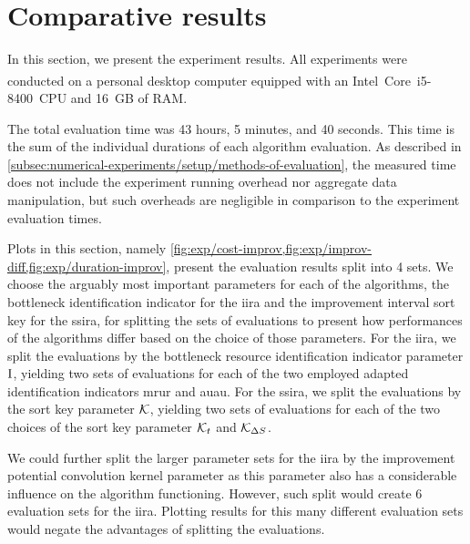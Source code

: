 \section{Comparative results} \label{sec:numerical-experiments/comparative-results}

In this section, we present the experiment results.
All experiments were conducted on a personal desktop computer equipped with an 
Intel\textsuperscript{\textregistered}~Core\texttrademark\ i5-8400~CPU and 16~GB of RAM.

The total evaluation time was 43 hours, 5 minutes, and 40 seconds.
This time is the sum of the individual durations of each algorithm evaluation.
As described in \cref{subsec:numerical-experiments/setup/methods-of-evaluation},
the measured time does not include the experiment running overhead nor aggregate data manipulation,
but such overheads are negligible in comparison to the experiment evaluation times.

Plots in this section, namely \cref{fig:exp/cost-improv,fig:exp/improv-diff,fig:exp/duration-improv},
present the evaluation results split into 4 sets.
We choose the arguably most important parameters for each of the algorithms,
the bottleneck identification indicator for the \ac{iira}
and the improvement interval sort key for the \ac{ssira},
for splitting the sets of evaluations to present how performances of the algorithms differ
based on the choice of those parameters.
For the \ac{iira},
we split the evaluations by the bottleneck resource identification indicator parameter $\mathrm{I}$,
yielding two sets of evaluations
for each of the two employed adapted identification indicators \ac{mrur} and \ac{auau}.
For the \ac{ssira},
we split the evaluations by the sort key parameter $\mathcal{K}$,
yielding two sets of evaluations for each of the two choices of the sort key parameter
$\mathcal{K}_{t}$ and $\mathcal{K}_{\Delta S_{}}$.

We could further split the larger parameter sets for the \ac{iira}
by the improvement potential convolution kernel parameter
as this parameter also has a considerable influence on the algorithm functioning.
However, such split would create 6 evaluation sets for the \ac{iira}.
Plotting results for this many different evaluation sets
would negate the advantages of splitting the evaluations.

